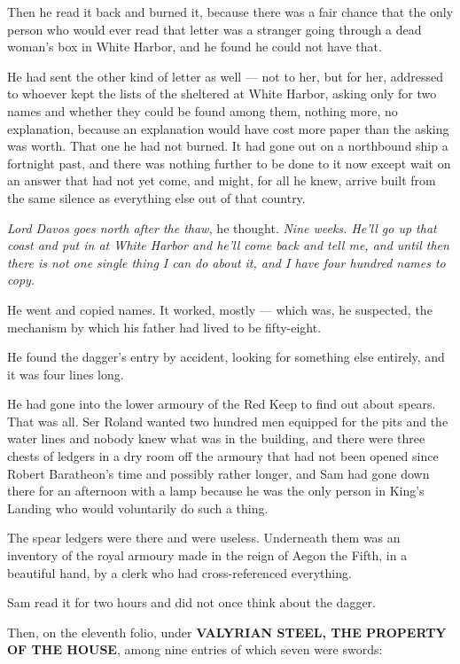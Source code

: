 Then he read it back and burned it, because there was a fair chance that the only person who would ever read that letter was a stranger going through a dead woman’s box in White Harbor, and he found he could not have that.

He had sent the other kind of letter as well — not to her, but for her, addressed to whoever kept the lists of the sheltered at White Harbor, asking only for two names and whether they could be found among them, nothing more, no explanation, because an explanation would have cost more paper than the asking was worth. That one he had not burned. It had gone out on a northbound ship a fortnight past, and there was nothing further to be done to it now except wait on an answer that had not yet come, and might, for all he knew, arrive built from the same silence as everything else out of that country.

\textit{Lord Davos goes north after the thaw,} he thought. \textit{Nine weeks. He’ll go up that coast and put in at White Harbor and he’ll come back and tell me, and until then there is not one single thing I can do about it, and I have four hundred names to copy.}

He went and copied names. It worked, mostly — which was, he suspected, the mechanism by which his father had lived to be fifty-eight.

\sceneBreak

He found the dagger’s entry by accident, looking for something else entirely, and it was four lines long.

He had gone into the lower armoury of the Red Keep to find out about spears. That was all. Ser Roland wanted two hundred men equipped for the pits and the water lines and nobody knew what was in the building, and there were three chests of ledgers in a dry room off the armoury that had not been opened since Robert Baratheon’s time and possibly rather longer, and Sam had gone down there for an afternoon with a lamp because he was the only person in King’s Landing who would voluntarily do such a thing.

The spear ledgers were there and were useless. Underneath them was an inventory of the royal armoury made in the reign of Aegon the Fifth, in a beautiful hand, by a clerk who had cross-referenced everything.

Sam read it for two hours and did not once think about the dagger.

Then, on the eleventh folio, under \textbf{VALYRIAN STEEL, THE PROPERTY OF THE HOUSE}, among nine entries of which seven were swords:

